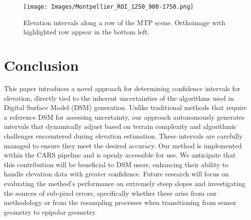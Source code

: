 \begin{figure}
    \centering
    \texttt{[image: Images/Montpellier\_ROI\_1250\_900-1750.png]}
    \caption{Elevation intervals along a row of the MTP scene. Orthoimage with highlighted row appear in the bottom left.}
    \label{fig:mtp_detailed}
\end{figure}

\section{Conclusion}
This paper introduces a novel approach for determining confidence intervals for elevation, directly tied to the inherent uncertainties of the algorithms used in Digital Surface Model (DSM) generation. Unlike traditional methods that require a reference DSM for assessing uncertainty, our approach autonomously generates intervals that dynamically adjust based on terrain complexity and algorithmic challenges encountered during elevation estimation. These intervals are carefully managed to ensure they meet the desired accuracy. Our method is implemented within the CARS pipeline and is openly accessible for use. We anticipate that this contribution will be beneficial to DSM users, enhancing their ability to handle elevation data with greater confidence. Future research will focus on evaluating the method's performance on extremely steep slopes and investigating the sources of sub-pixel errors, specifically whether these arise from our methodology or from the resampling processes when transitioning from sensor geometry to epipolar geometry.
